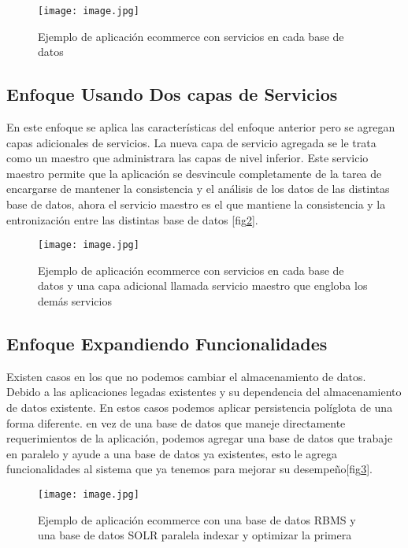 \documentclass[conference,compsoc]{IEEEtran}
\begin{document}
\begin{figure}[!h]
\centering
\texttt{[image: image.jpg]}
\caption{Ejemplo de aplicación ecommerce con servicios en cada base de datos \cite{art15} }
\label{enfoque4}
\end{figure}

\subsection{Enfoque Usando Dos capas de  Servicios }
En este enfoque se aplica las características del enfoque anterior pero se agregan capas adicionales de servicios. La nueva capa de servicio agregada se le trata como un  maestro que administrara las capas de nivel inferior. Este servicio maestro permite que la aplicación se desvincule completamente de la tarea de encargarse de mantener la consistencia y el análisis de los datos  de las distintas base de datos, ahora el servicio maestro es el que mantiene la consistencia y la entronización entre las distintas base de datos
[fig\ref{enfoque5}].

\begin{figure}[!h]
\centering
\texttt{[image: image.jpg]}
\caption{Ejemplo de aplicación ecommerce con servicios en cada base de datos y una capa adicional llamada servicio maestro que engloba los demás servicios }
\label{enfoque5}
\end{figure}

\subsection{Enfoque Expandiendo Funcionalidades }
Existen casos en los que no podemos cambiar el almacenamiento de datos. Debido a las aplicaciones legadas existentes y su dependencia del almacenamiento de datos existente. 
En estos casos podemos aplicar persistencia políglota de una forma diferente. en vez de una base de datos que maneje directamente requerimientos de la aplicación, podemos agregar una base de datos que trabaje en paralelo y ayude a  una base de datos ya existentes, esto le  agrega funcionalidades al sistema que ya tenemos para mejorar su desempeño[fig\ref{enfoque6}].

\begin{figure}[!h]
\centering
\texttt{[image: image.jpg]}
\caption{Ejemplo de aplicación ecommerce con una base de datos RBMS y una base de datos SOLR paralela indexar y optimizar la primera \cite{art15} }
\label{enfoque6}
\end{figure}
\end{document}
